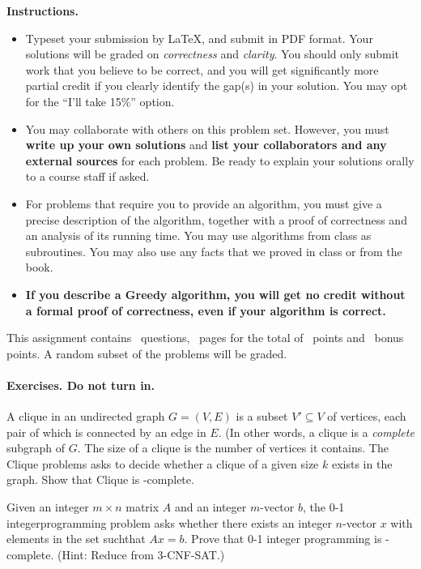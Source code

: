 \noindent \textbf{Instructions.}

\begin{itemize} 
\item Typeset your submission by \LaTeX, and submit in PDF
  format. Your solutions will be graded on \emph{correctness} and
  \emph{clarity}. You should only submit work that you believe to be
  correct, and you will get significantly more partial credit if you
  clearly identify the gap(s) in your solution. You may opt for the
  ``I’ll take 15\%'' option.
\item You may collaborate with others on this problem set.  However,
  you must \textbf{{write up your own solutions}} and \textbf{{list
      your collaborators and any external sources}} for each
  problem. Be ready to explain your solutions orally to a course staff
  if asked.
\item For problems that require you to provide an algorithm, you must
  give a precise description of the algorithm, together with a proof
  of correctness and an analysis of its running time. You may use
  algorithms from class as subroutines. You may also use any facts
  that we proved in class or from the book.
\item \textbf{If you describe a Greedy algorithm, you will get no
    credit without a formal proof of correctness, even if your
    algorithm is correct.}
\end{itemize}

\noindent This assignment contains \numquestions\ questions,
\numpages\ pages for the total of \numpoints \ points and
\numbonuspoints\ bonus points. A random subset of the problems will be
graded. \medskip

\paragraph{Exercises. Do not turn in.}
\begin{questions}
  \question A clique in an undirected graph $G =(V, E)$ is a subset
  $V' \subseteq V$ of vertices, each pair of which is connected by an
  edge in $E$. (In other words, a clique is a \emph{complete} subgraph
  of $G$. The size of a clique is the number of vertices it
  contains. The Clique problems asks to decide whether a clique of a
  given size $k$ exists in the graph. Show that Clique is
  \NP-complete.

  \question Given an integer $m\times n$ matrix $A$ and an integer
  $m$-vector $b$, the 0-1 integerprogramming problem asks whether
  there exists an integer $n$-vector $x$ with elements in the set \bit
  suchthat $Ax =b$. Prove that 0-1 integer programming is
  \NP-complete. (Hint: Reduce from 3-CNF-SAT.)

\end{questions}
\newpage 
